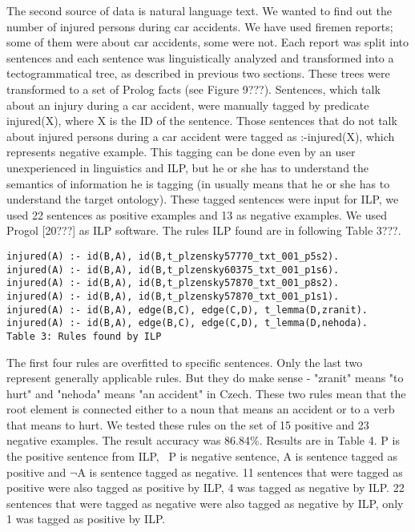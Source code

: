 \documentclass{sig-alternate}
\begin{document}
The second source of data is natural language text. We wanted to find out the number of injured persons during car accidents. We have used firemen reports; some of them were about car accidents, some were not. Each report was split into sentences and each sentence was linguistically analyzed and transformed into a tectogrammatical tree, as described in previous two sections. These trees were transformed to a set of Prolog facts (see Figure 9???). 
Sentences, which talk about an injury during a car accident, were manually tagged by predicate injured(X), where X is the ID of the sentence. Those sentences that do not talk about injured persons during a car accident were tagged as :-injured(X), which represents negative example. This tagging can be done even by an user unexperienced in linguistics and ILP, but he or she has to understand the semantics of information he is tagging (in usually means that he or she has to understand the target ontology).
These tagged sentences were input for ILP, we used 22 sentences as positive examples and 13 as negative examples. We used Progol [20???] as ILP software.
The rules ILP found are in following Table 3???.

\begin{verbatim}
injured(A) :- id(B,A), id(B,t_plzensky57770_txt_001_p5s2).
injured(A) :- id(B,A), id(B,t_plzensky60375_txt_001_p1s6).
injured(A) :- id(B,A), id(B,t_plzensky57870_txt_001_p8s2).
injured(A) :- id(B,A), id(B,t_plzensky57870_txt_001_p1s1).
injured(A) :- id(B,A), edge(B,C), edge(C,D), t_lemma(D,zranit).
injured(A) :- id(B,A), edge(B,C), edge(C,D), t_lemma(D,nehoda).
Table 3: Rules found by ILP
\end{verbatim}

The first four rules are overfitted to specific sentences. Only the last two represent generally applicable rules. But they do make sense - "zranit" means "to hurt" and "nehoda" means "an accident" in Czech. These two rules mean that the root element is connected either to a noun that means an accident or to a verb that means to hurt.
We tested these rules on the set of 15 positive and 23 negative examples. The result accuracy was 86.84\%. Results are in Table 4. P is the positive sentence from ILP, ~P is negative sentence, A is sentence tagged as positive and $\neg$A is sentence tagged as negative. 11 sentences that were tagged as positive were also tagged as positive by ILP, 4 was tagged as negative by ILP. 22 sentences that were tagged as negative were also tagged as negative by ILP, only 1 was tagged as positive by ILP.
\end{document}
